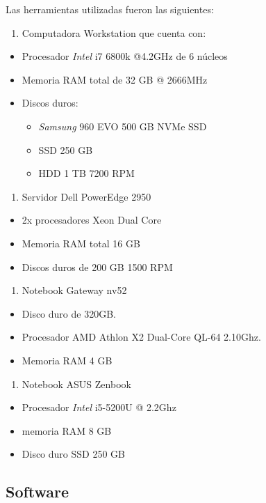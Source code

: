 \documentclass[12pt,twoside]{reedthesis}
\providecommand{\tightlist}{%
  \setlength{\itemsep}{0pt}\setlength{\parskip}{0pt}}
\theoremstyle{definition}
\theoremstyle{definition}
\theoremstyle{definition}
\theoremstyle{remark}
\begin{document}
Las herramientas utilizadas fueron las siguientes:
\begin{enumerate}
\def\labelenumi{\arabic{enumi}.}
\tightlist
\item
  Computadora Workstation que cuenta con:
\end{enumerate}
\begin{itemize}
\tightlist
\item
  Procesador \emph{Intel} i7 6800k @4.2GHz de 6 núcleos
\item
  Memoria RAM total de 32 GB @ 2666MHz
\item
  Discos duros:
  \begin{itemize}
  \tightlist
  \item
    \emph{Samsung} 960 EVO 500 GB NVMe SSD
  \item
    SSD 250 GB
  \item
    HDD 1 TB 7200 RPM
  \end{itemize}
\end{itemize}
\begin{enumerate}
\def\labelenumi{\arabic{enumi}.}
\setcounter{enumi}{1}
\tightlist
\item
  Servidor Dell PowerEdge 2950
\end{enumerate}
\begin{itemize}
\tightlist
\item
  2x procesadores Xeon Dual Core
\item
  Memoria RAM total 16 GB
\item
  Discos duros de 200 GB 1500 RPM
\end{itemize}
\begin{enumerate}
\def\labelenumi{\arabic{enumi}.}
\setcounter{enumi}{2}
\tightlist
\item
  Notebook Gateway nv52
\end{enumerate}
\begin{itemize}
\tightlist
\item
  Disco duro de 320GB.
\item
  Procesador AMD Athlon X2 Dual-Core QL-64 2.10Ghz.
\item
  Memoria RAM 4 GB
\end{itemize}
\begin{enumerate}
\def\labelenumi{\arabic{enumi}.}
\setcounter{enumi}{3}
\tightlist
\item
  Notebook ASUS Zenbook
\end{enumerate}
\begin{itemize}
\tightlist
\item
  Procesador \emph{Intel} i5-5200U @ 2.2Ghz
\item
  memoria RAM 8 GB
\item
  Disco duro SSD 250 GB
\end{itemize}
\hypertarget{software}{%
\subsection{Software}\label{software}}
\end{document}
